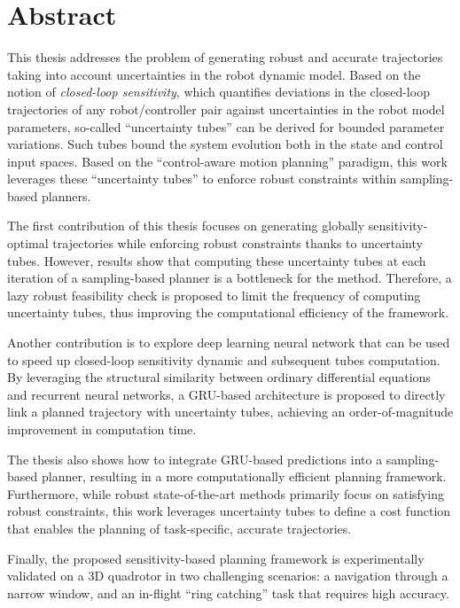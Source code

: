 \chapter*{Abstract}

This thesis addresses the problem of generating robust and accurate trajectories taking into account uncertainties in the robot dynamic model. 
Based on the notion of \emph{closed-loop sensitivity}, which quantifies deviations in the closed-loop trajectories of any robot/controller pair against uncertainties in the robot model parameters, so-called ``uncertainty tubes'' can be derived for bounded parameter variations.
Such tubes bound the system evolution both in the state and control input spaces.
Based on the ``control-aware motion planning'' paradigm, this work leverages these ``uncertainty tubes'' to enforce robust constraints within sampling-based planners.

The first contribution of this thesis focuses on generating globally sensitivity-optimal trajectories while enforcing robust constraints thanks to uncertainty tubes.
However, results show that computing these uncertainty tubes at each iteration of a sampling-based planner is a bottleneck for the method.
Therefore, a lazy robust feasibility check is proposed to limit the frequency of computing uncertainty tubes, thus improving the computational efficiency of the framework.

Another contribution is to explore deep learning neural network that can be used to speed up closed-loop sensitivity dynamic and subsequent tubes computation.
By leveraging the structural similarity between ordinary differential equations and recurrent neural networks, a GRU-based architecture is proposed to directly link a planned trajectory with uncertainty tubes, achieving an order-of-magnitude improvement in computation time.

The thesis also shows how to integrate GRU-based predictions into a sampling-based planner, resulting in a more computationally efficient planning framework. 
Furthermore, while robust state-of-the-art methods primarily focus on satisfying robust constraints, this work leverages uncertainty tubes to define a cost function that enables the planning of task-specific, accurate trajectories.

Finally, the proposed sensitivity-based planning framework is experimentally validated on a 3D quadrotor in two challenging scenarios: a navigation through a narrow window, and an in-flight ``ring catching'' task that requires high accuracy. 